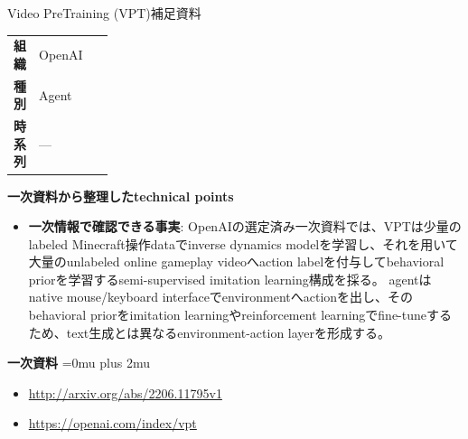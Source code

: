 \begin{technicalnote}{Video PreTraining (VPT)}{補足資料}
\begingroup
\begin{tabularx}{\linewidth}{@{}>{\bfseries}p{0.22\linewidth}X@{}}
組織 & OpenAI \\
種別 & Agent \\
時系列 & — \\
\end{tabularx}
\smallskip
{\bfseries 一次資料から整理したtechnical points}
\begin{itemize}[leftmargin=1.5em,itemsep=0.35em]
\item \textbf{一次情報で確認できる事実}: OpenAIの選定済み一次資料では、VPTは少量のlabeled Minecraft操作dataでinverse dynamics modelを学習し、それを用いて大量のunlabeled online gameplay videoへaction labelを付与してbehavioral priorを学習するsemi-supervised imitation learning構成を採る。 agentはnative mouse/keyboard interfaceでenvironmentへactionを出し、そのbehavioral priorをimitation learningやreinforcement learningでfine-tuneするため、text生成とは異なるenvironment-action layerを形成する。
\end{itemize}
\begin{minipage}{\linewidth}
\begin{samepage}
{\bfseries 一次資料}
\begingroup\sloppy
\Urlmuskip=0mu plus 2mu\relax
\begin{itemize}[leftmargin=1.5em,itemsep=0.25em]
\item {\scriptsize\url{http://arxiv.org/abs/2206.11795v1}}
\item {\scriptsize\url{https://openai.com/index/vpt}}
\end{itemize}
\endgroup
\end{samepage}
\end{minipage}
\endgroup
\end{technicalnote}
\medskip

